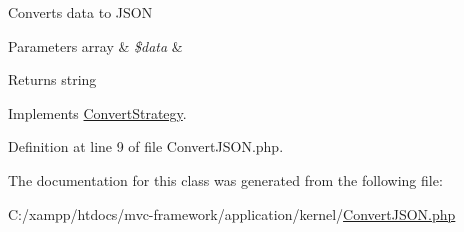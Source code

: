 Converts data to J\+S\+ON


\begin{DoxyParams}[1]{Parameters}
array & {\em \$data} & \\
\hline
\end{DoxyParams}
\begin{DoxyReturn}{Returns}
string 
\end{DoxyReturn}


Implements \hyperlink{interface_convert_strategy_a41444ea294bbd35a6c07ef4e9faeae10}{Convert\+Strategy}.



Definition at line 9 of file Convert\+J\+S\+O\+N.\+php.




The documentation for this class was generated from the following file\+:\begin{DoxyCompactItemize}
\item 
C\+:/xampp/htdocs/mvc-\/framework/application/kernel/\hyperlink{_convert_j_s_o_n_8php}{Convert\+J\+S\+O\+N.\+php}\end{DoxyCompactItemize}
